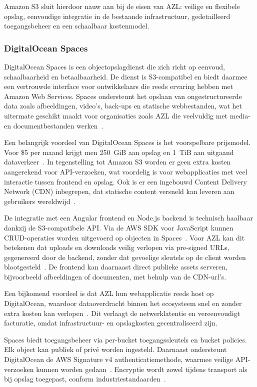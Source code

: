 Amazon S3 sluit hierdoor nauw aan bij de eisen van AZL: veilige en flexibele opslag, eenvoudige integratie in de bestaande infrastructuur, gedetailleerd toegangsbeheer en een schaalbaar kostenmodel.

\subsubsection{DigitalOcean Spaces}
DigitalOcean Spaces is een objectopslagdienst die zich richt op eenvoud, schaalbaarheid en betaalbaarheid. De dienst is S3-compatibel en biedt daarmee een vertrouwde interface voor ontwikkelaars die reeds ervaring hebben met Amazon Web Services. Spaces ondersteunt het opslaan van ongestructureerde data zoals afbeeldingen, video's, back-ups en statische webbestanden, wat het uitermate geschikt maakt voor organisaties zoals AZL die veelvuldig met media- en documentbestanden werken~\autocite{do_product}.

Een belangrijk voordeel van DigitalOcean Spaces is het voorspelbare prijsmodel. Voor \$5 per maand krijgt men 250~GiB aan opslag en 1~TiB aan uitgaand dataverkeer~\autocite{do_pricing}. In tegenstelling tot Amazon S3 worden er geen extra kosten aangerekend voor API-verzoeken, wat voordelig is voor webapplicaties met veel interactie tussen frontend en opslag. Ook is er een ingebouwd Content Delivery Network (CDN) inbegrepen, dat statische content versneld kan leveren aan gebruikers wereldwijd~\autocite{do_features}.

De integratie met een Angular frontend en Node.js backend is technisch haalbaar dankzij de S3-compatibele API. Via de AWS SDK voor JavaScript kunnen CRUD-operaties worden uitgevoerd op objecten in Spaces~\autocite{do_sdk}. Voor AZL kan dit betekenen dat uploads en downloads veilig verlopen via pre-signed URLs, gegenereerd door de backend, zonder dat gevoelige sleutels op de client worden blootgesteld~\autocite{do_security}. De frontend kan daarnaast direct publieke assets serveren, bijvoorbeeld afbeeldingen of documenten, met behulp van de CDN-url's.

Een bijkomend voordeel is dat AZL hun webapplicatie reeds host op DigitalOcean, waardoor dataoverdracht binnen het ecosysteem snel en zonder extra kosten kan verlopen~\autocite{do_latency}. Dit verlaagt de netwerklatentie en vereenvoudigt facturatie, omdat infrastructuur- en opslagkosten gecentraliseerd zijn.

Spaces biedt toegangsbeheer via per-bucket toegangssleutels en bucket policies. Elk object kan publiek of privé worden ingesteld. Daarnaast ondersteunt DigitalOcean de AWS Signature v4 authenticatiemethode, waarmee veilige API-verzoeken kunnen worden gedaan~\autocite{do_accesskeys}. Encryptie wordt zowel tijdens transport als bij opslag toegepast, conform industriestandaarden~\autocite{do_security_model}.

